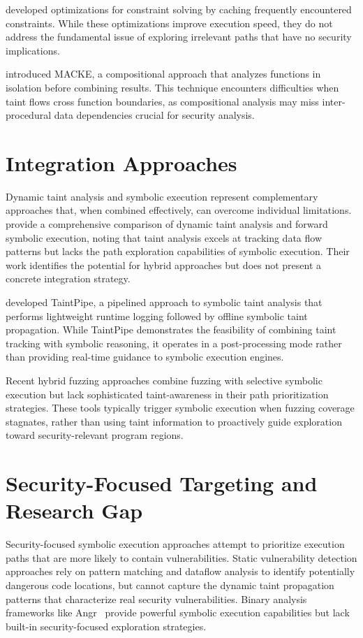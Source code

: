 \citet{poeplau_symbolic_2020} developed optimizations for constraint solving by caching frequently encountered constraints. While these optimizations improve execution speed, they do not address the fundamental issue of exploring irrelevant paths that have no security implications.

\citet{ognawala_macke_2016} introduced MACKE, a compositional approach that analyzes functions in isolation before combining results. This technique encounters difficulties when taint flows cross function boundaries, as compositional analysis may miss inter-procedural data dependencies crucial for security analysis.

\section{Integration Approaches}

Dynamic taint analysis and symbolic execution represent complementary approaches that, when combined effectively, can overcome individual limitations. \citet{schwartz_all_2010} provide a comprehensive comparison of dynamic taint analysis and forward symbolic execution, noting that taint analysis excels at tracking data flow patterns but lacks the path exploration capabilities of symbolic execution. Their work identifies the potential for hybrid approaches but does not present a concrete integration strategy.

\citet{ming_taintpipe_2015} developed TaintPipe, a pipelined approach to symbolic taint analysis that performs lightweight runtime logging followed by offline symbolic taint propagation. While TaintPipe demonstrates the feasibility of combining taint tracking with symbolic reasoning, it operates in a post-processing mode rather than providing real-time guidance to symbolic execution engines.

Recent hybrid fuzzing approaches combine fuzzing with selective symbolic execution but lack sophisticated taint-awareness in their path prioritization strategies. These tools typically trigger symbolic execution when fuzzing coverage stagnates, rather than using taint information to proactively guide exploration toward security-relevant program regions.

\section{Security-Focused Targeting and Research Gap}

Security-focused symbolic execution approaches attempt to prioritize execution paths that are more likely to contain vulnerabilities. Static vulnerability detection approaches rely on pattern matching and dataflow analysis to identify potentially dangerous code locations, but cannot capture the dynamic taint propagation patterns that characterize real security vulnerabilities. Binary analysis frameworks like Angr~\cite{shoshitaishvili_sok_2016} provide powerful symbolic execution capabilities but lack built-in security-focused exploration strategies.


